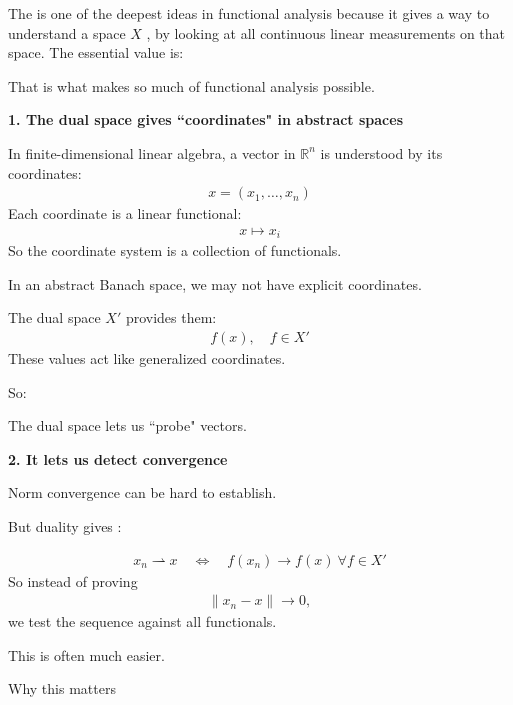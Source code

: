 \documentclass[12pt,a4paper]{report}
\begin{document}
The  is one of the deepest ideas in functional analysis because it gives a way to understand a space $X$ , by looking at all continuous linear measurements on that space.  The essential value is: \> 

That is what makes so much of functional analysis possible.

\begin{description}

\item \textbf{1. The dual space gives ``coordinates" in abstract spaces}

In finite-dimensional linear algebra, a vector in $\mathbb R^n$ is understood by its coordinates:
\begin{align*}
x=(x_1,\dots,x_n)
\end{align*}
Each coordinate is a linear functional:
\begin{align*}
x\mapsto x_i
\end{align*}
So the coordinate system is a collection of functionals.

In an abstract Banach space, we may not have explicit coordinates.

The dual space $X'$ provides them:
\begin{align*}
f(x),\quad f\in X'
\end{align*}
These values act like generalized coordinates.

So:

\> The dual space lets us ``probe" vectors.

\item \textbf{2. It lets us detect convergence}

Norm convergence can be hard to establish.

But duality gives :

\begin{align*}
x_n\rightharpoonup x
\quad\Longleftrightarrow\quad
f(x_n)\to f(x)\ \forall f\in X'
\end{align*}
So instead of proving
\begin{align*}
\|x_n-x\|\to 0,
\end{align*}
we test the sequence against all functionals.

This is often much easier.

    \item Why this matters


\end{description}
\end{document}
